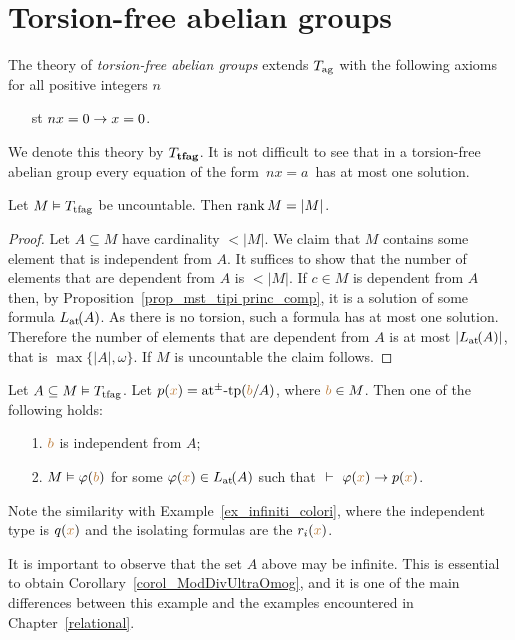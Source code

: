 \documentclass[creche.tex]{subfiles}
\begin{document}
\section{Torsion-free abelian groups}

The theory of \emph{torsion-free abelian groups\/} extends $T_{\rm ag}$ with the following axioms for all positive integers $n$
\begin{itemize}
\item[st] $nx= 0\imp x=0$.
\end{itemize}
We denote this theory by \emph{$T_{\rm\bf tfag}$}. It is not difficult to see that in a torsion-free abelian group every equation of the form $\,nx = a\,$ has at most one solution.


\begin{proposition}
Let $M\models T_{\rm tfag}$ be uncountable. Then $\rank M=|M|$. 
\end{proposition}

\begin{proof}
Let $A\subseteq M$ have cardinality $<|M|$. We claim that $M$ contains some element that is independent from $A$. It suffices to show that the number of elements that are dependent from $A$ is $<|M|$. If $c\in M$ is dependent from $A$ then, by Proposition~\ref{prop_mst_tipi princ_comp}, it is a solution of some formula $\atL(A)$. As there is no torsion, such a formula has at most one solution. Therefore the number of elements that are dependent from $A$ is at most $|\atL(A)|$, that is $\max\big\{|A|,\omega\big\}$. If $M$ is uncountable the claim follows.
\end{proof}

\begin{proposition}\label{prop_mst_tipi princ_comp}
Let $A\subseteq M\models T_{\rm tfag}$.  Let $p({\mr x})=\atpmtp({\mr b}/A)$, where ${\mr b} \in M$. Then one of the following holds:   
\begin{itemize}
\item[1.] ${\mr b}$ is independent from $A$;
\item[2.] $M\models\phi({\mr b})$ for some $\phi({\mr x})\in\atL(A)$ such that $\ \proves\ \phi({\mr x})\imp p({\mr x})$.
\end{itemize}\end{proposition}

Note the similarity with Example~\ref{ex_infiniti_colori}, where the independent type is $q({\mr x})$ and the isolating formulas are the $r_i({\mr x})$. 

It is important to observe that the set $A$ above may be infinite. This is essential to obtain Corollary~\ref{corol_ModDivUltraOmog}, and it is one of the main differences between this example and the examples encountered in Chapter~\ref{relational}. %
\end{document}
